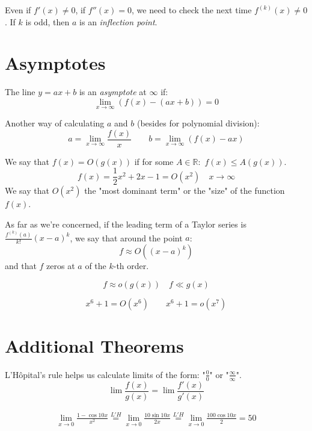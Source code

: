 \documentclass[00_complete]{subfiles}
\begin{document}
\begin{note}
    Even if $f'(x) \neq 0$, if $f''(x)=0$, we need to check the next time
    $f^{(k)}(x) \neq 0$. If $k$ is odd, then $a$ is an \emph{inflection point}.
\end{note}

\section{Asymptotes}
The line $y=ax+b$ is an \emph{asymptote} at $\infty$ if:
$$\lim\limits_{x \to \infty} (f(x)-(ax+b)) = 0$$

Another way of calculating $a$ and $b$ (besides for polynomial division):
$$a=\lim\limits_{x \to \infty} \frac{f(x)}{x} \quad \quad
b = \lim\limits_{x \to \infty} (f(x)-ax)$$

\begin{definition}
    We say that $f(x)=O(g(x))$ if for some $A \in \mathbb{R}:$ $f(x) \leq
    A(g(x))$.
    $$f(x)=\frac{1}{2}x^2+2x-1 = O(x^2) \quad x \to \infty$$
    We say that $O(x^2)$ the "most dominant term" or the "size" of the function
    $f(x)$.

    As far as we're concerned, if the leading term of a Taylor series is
    $\frac{f^{(k)}(a)}{k!}(x-a)^k$, we say that around the point $a$:
    $$f \approx O((x-a)^k)$$
    and that $f$ zeros at $a$ of the $k$-th order.
\end{definition}
\begin{definition}
        $$f \approx o(g(x)) \quad f \ll g(x)$$
\end{definition}
\begin{example}
    $$x^6+1 = O(x^6) \quad \quad x^6+1 = o(x^7)$$
\end{example}

\section{Additional Theorems}

\begin{definition}

    L'H\^{o}pital's rule helps us calculate limits of the form: "$\frac{0}{0}$"
    or "$\frac{\infty}{\infty}$".
    $$\lim \frac{f(x)}{g(x)} = \lim \frac{f'(x)}{g'(x)}$$
    \begin{example}
        $$
        \begin{gathered}
            \lim\limits_{x \to 0} \frac{1-\cos 10x}{x^2} \overset{L'H}{=}
            \lim\limits_{x \to 0} \frac{10\sin 10x}{2x}  \overset{L'H}{=}
            \lim\limits_{x \to 0} \frac{100\cos 10x}{2} = 50
        \end{gathered}
        $$
    \end{example}
\end{definition}
\end{document}
